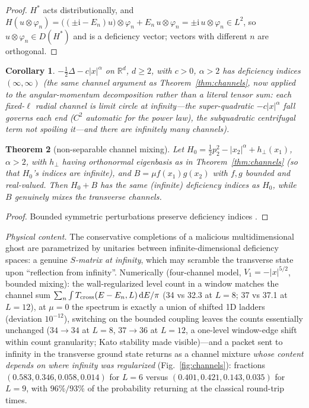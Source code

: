 \documentclass[11pt]{article}
\newtheorem{theorem}{Theorem}[section]
\newtheorem{corollary}[theorem]{Corollary}
\theoremstyle{definition}
\theoremstyle{remark}
\newcommand{\dd}{\mathrm{d}}
\newcommand{\ii}{\mathrm{i}}
\begin{document}
\begin{proof}
$H^{*}$ acts distributionally, and
$H(u\otimes\varphi_n)
=\bigl((\pm\ii-E_n)u\bigr)\otimes\varphi_n+E_n\,u\otimes\varphi_n
=\pm\ii\,u\otimes\varphi_n\in L^{2}$,
so $u\otimes\varphi_n\in D(H^{*})$ and is a deficiency vector; vectors
with different $n$ are orthogonal.
\end{proof}

\begin{corollary}
\label{cor:central}
$-\tfrac12\Delta-c|x|^{\alpha}$ on $\mathbb R^{d}$, $d\ge2$, with $c>0$,
$\alpha>2$ has
deficiency indices $(\infty,\infty)$ (the same channel argument as
Theorem~\ref{thm:channels}, now applied to the angular-momentum
decomposition rather than a literal tensor sum: each fixed-$\ell$ radial
channel is limit circle at infinity---the super-quadratic $-c|x|^{\alpha}$
fall governs each end ($C^{2}$ automatic for the power law), the subquadratic
centrifugal term not spoiling it---and there are infinitely many channels).
\end{corollary}

\begin{theorem}[non-separable channel mixing]
\label{thm:kato}
Let $H_0=\tfrac12p_2^{2}-|x_2|^{\alpha}+h_{\perp}(x_1)$, $\alpha>2$, with
$h_{\perp}$ having orthonormal eigenbasis as in
Theorem~\ref{thm:channels} (so that $H_0$'s indices are infinite), and
$B=\mu f(x_1)g(x_2)$ with $f,g$ bounded and real-valued. Then
$H_0+B$ has the same
(infinite) deficiency indices as $H_0$, while $B$ genuinely mixes the
transverse channels.
\end{theorem}

\begin{proof}
Bounded symmetric perturbations preserve deficiency indices
\cite{KatoBook}.
\end{proof}

\emph{Physical content.} The conservative completions of a malicious
multidimensional ghost are parametrized by unitaries between
infinite-dimensional deficiency spaces: a genuine \emph{$S$-matrix at
infinity}, which may scramble the transverse state upon ``reflection from
infinity''. Numerically (four-channel model, $V_1=-|x|^{5/2}$, bounded
mixing): the wall-regularized level count in a window matches the channel
sum $\sum_n\int T_{\rm cross}(E-E_n,L)\,\dd E/\pi$ (34 vs 32.3 at $L=8$;
37 vs 37.1 at $L=12$), at $\mu=0$ the spectrum is exactly a union of
shifted 1D ladders (deviation $10^{-12}$), switching on the bounded
coupling leaves the counts essentially unchanged ($34\to34$ at $L=8$,
$37\to36$ at $L=12$, a one-level window-edge shift within count
granularity; Kato stability made visible)---and a
packet sent to infinity in the transverse ground state returns as a
channel mixture \emph{whose content depends on where infinity was
regularized} (Fig.~\ref{fig:channels}): fractions
$(0.583,0.346,0.058,0.014)$ for $L=6$ versus $(0.401,0.421,0.143,0.035)$
for $L=9$, with $96\%/93\%$ of the probability returning at the classical
round-trip times.
\end{document}
